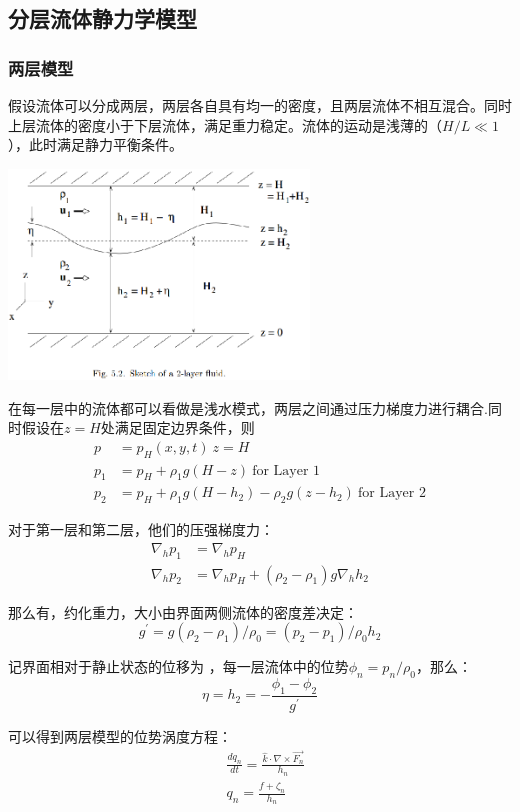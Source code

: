 \documentclass{article}
\begin{document}
\subsection{分层流体静力学模型}
\subsubsection{两层模型}
假设流体可以分成两层，两层各自具有均一的密度，且两层流体不相互混合。同时上层流体的密度小于下层流体，满足重力稳定。流体的运动是浅薄的（$H/L \ll 1$），此时满足静力平衡条件。

\begin{center}
\includegraphics[width=8cm]{Fig4_1.png}
\end{center}

在每一层中的流体都可以看做是浅水模式，两层之间通过压力梯度力进行耦合.同时假设在$z=H$处满足固定边界条件，则
\begin{align}
p&=p_H(x,y,t) \ z=H \\
p_1&=p_H + \rho_1 g(H-z)  \ \text{for Layer 1} \\
p_2&=p_H + \rho_1 g(H-h_2) - \rho_2 g(z-h_2)  \ \text{for Layer 2}
\end{align}

对于第一层和第二层，他们的压强梯度力：
\begin{align}
\nabla_h p_1 &= \nabla_h p_H \\
\nabla_h p_2 &= \nabla_h p_H + (\rho_2-\rho_1)g\nabla_hh_2 
\end{align}

那么有，约化重力，大小由界面两侧流体的密度差决定：
$$g^{\prime} = g(\rho_2-\rho_1)/\rho_0 = (p_2-p_1)/\rho_0h_2$$

记界面相对于静止状态的位移为 ，每一层流体中的位势$\phi_n=p_n/\rho_0$，那么：
$$\eta=h_2=-\frac{\phi_1-\phi_2}{g^{\prime}}$$

可以得到两层模型的位势涡度方程：
\begin{align}
&\frac{dq_n}{dt}=\frac{\hat{k}\cdot\nabla\times\vec{F_n}}{h_n}\\
&q_n=\frac{f+\zeta_n}{h_n}   
\end{align}
\end{document}
